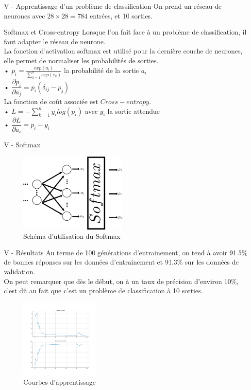 \documentclass[10pt]{beamer}
\begin{document}
\begin{frame}{V - Apprentissage d'un problème de classification}
On prend un réseau de neurones avec $28 \times 28 = 784$ entrées, et 10 sorties. \\
\begin{block}{Softmax et Cross-entropy}
Lorsque l'on fait face à un problème de classification, il faut adapter le réseau de neurone. \\
La fonction d'activation softmax est utilisé pour la dernière couche de neurones, elle permet de normaliser les probabilités de sorties. \\
• $p_i = \frac{exp(a_i)}{\sum_{k=1}^{n}exp(e_k)}$ la probabilité de la sortie $a_i$ \\
• $\dfrac{\partial p_i}{\partial a_j} = p_i(\delta_{ij}-p_j)$ \\
La fonction de coût associée est $Cross-entropy$. \\
• $L = -\sum_{k=1}^{n}y_ilog(p_i)$ avec $y_i$ la sortie attendue \\
• $\dfrac{\partial L}{\partial a_i} = p_i - y_i$
\end{block}
\end{frame}

\begin{frame}{V - Softmax}
\begin{figure}
	\centering
    \includegraphics[height=150px]{2-Softmax.png}
	\caption{Schéma d'utilisation du Softmax}
\end{figure}
\end{frame}

\begin{frame}{V - Résultats}
Au terme de 100 générations d'entrainement, on tend à avoir 91.5\% de bonnes réponses sur les données d'entrainement et 91.3\% sur les données de validation. \\
On peut remarquer que dès le début, on à un taux de précision d'environ 10\%, c'est dû au fait que c'est un problème de classification à 10 sorties.
\begin{figure}
	\centering
    \includegraphics[height=150px]{3-Apprentissage.jpg}
	\caption{Courbes d'apprentissage}
\end{figure}
\end{frame}
\end{document}
